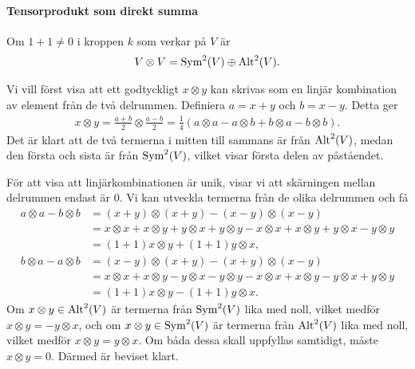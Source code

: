 \paragraph{Tensorprodukt som direkt summa}
Om $1 + 1\neq 0$ i kroppen $k$ som verkar på $V$ är
\begin{align*}
	V\otimes V = \Sym[2]{V} \oplus \Alt[2]{V}.
\end{align*}

\proof
Vi vill först visa att ett godtyckligt $x\otimes y$ kan skrivas som en linjär kombination av element från de två delrummen. Definiera $a = x + y$ och $b = x - y$. Detta ger
\begin{align*}
	x\otimes y = \frac{a + b}{2}\otimes\frac{a - b}{2} = \frac{1}{4}(a\otimes a - a\otimes b + b\otimes a - b\otimes b).
\end{align*}
Det är klart att de två termerna i mitten till sammans är från $\Alt[2]{V}$, medan den första och sista är från $\Sym[2]{V}$, vilket visar första delen av påståendet.

För att visa att linjärkombinationen är unik, visar vi att skärningen mellan delrummen endast är $0$. Vi kan utveckla termerna från de olika delrummen och få
\begin{align*}
	a\otimes a - b\otimes b &= (x + y)\otimes (x + y) - (x - y)\otimes (x - y) \\
	                        &= x\otimes x + x\otimes y + y\otimes x + y\otimes y - x\otimes x + x\otimes y + y\otimes x - y\otimes y \\
	                        &= (1 + 1)x\otimes y + (1 + 1)y\otimes x, \\
	b\otimes a - a\otimes b &= (x - y)\otimes (x + y) - (x + y)\otimes (x - y) \\
	                        &= x\otimes x + x\otimes y - y\otimes x - y\otimes y - x\otimes x + x\otimes y - y\otimes x + y\otimes y \\
	                        &= (1 + 1)x\otimes y - (1 + 1)y\otimes x.
\end{align*}
Om $x\otimes y\in\Alt[2]{V}$ är termerna från $\Sym[2]{V}$ lika med noll, vilket medför $x\otimes y = -y\otimes x$, och om $x\otimes y\in\Sym[2]{V}$ är termerna från $\Alt[2]{V}$ lika med noll, vilket medför $x\otimes y = y\otimes x$. Om båda dessa skall uppfyllas samtidigt, måste $x\otimes y = 0$. Därmed är beviset klart.